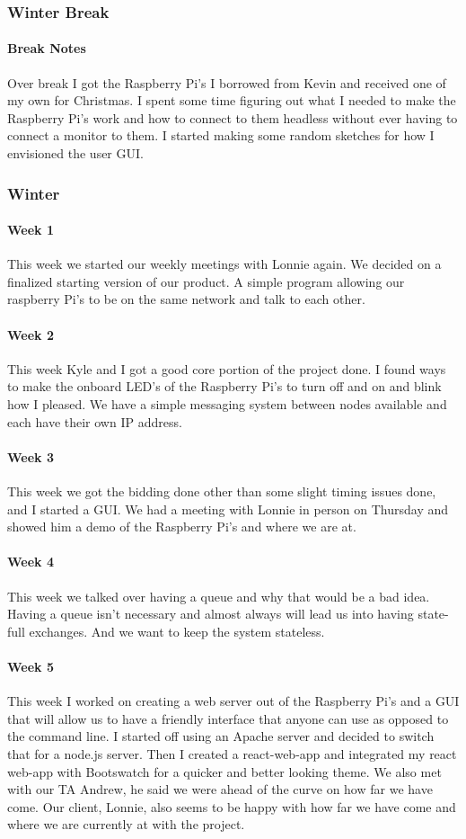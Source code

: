 \documentclass[draftclsnofoot, onecolumn, compsoc, 10pt]{IEEEtran}
\begin{document}
\subsubsection{Winter Break}
\paragraph{Break Notes}
Over break I got the Raspberry Pi's I borrowed from Kevin and received one of my own for Christmas. I spent some time figuring out what I needed to make the Raspberry Pi's work and how to connect to them headless without ever having to connect a monitor to them. I started making some random sketches for how I envisioned the user GUI.
\subsubsection{Winter}
\paragraph{Week 1}
This week we started our weekly meetings with Lonnie again. We decided on a finalized starting version of our product. A simple program allowing our raspberry Pi's to be on the same network and talk to each other. 
\paragraph{Week 2}
This week Kyle and I got a good core portion of the project done. I found ways to make the onboard LED's of the Raspberry Pi's to turn off and on and blink how I pleased. We have a simple messaging system between nodes available and each have their own IP address. 
\paragraph{Week 3}
This week we got the bidding done other than some slight timing issues done, and I started a GUI. We had a meeting with Lonnie in person on Thursday and showed him a demo of the Raspberry Pi's and where we are at. 
\paragraph{Week 4}
This week we talked over having a queue and why that would be a bad idea. Having a queue isn't necessary and almost always will lead us into having state-full exchanges. And we want to keep the system stateless. 
\paragraph{Week 5}
This week I worked on creating a web server out of the Raspberry Pi's and a GUI that will allow us to have a friendly interface that anyone can use as opposed to the command line. I started off using an Apache server and decided to switch that for a node.js server. Then I created a react-web-app and integrated my react web-app with Bootswatch for a quicker and better looking theme. We also met with our TA Andrew, he said we were ahead of the curve on how far we have come. Our client, Lonnie, also seems to be happy with how far we have come and where we are currently at with the project.
\end{document}
